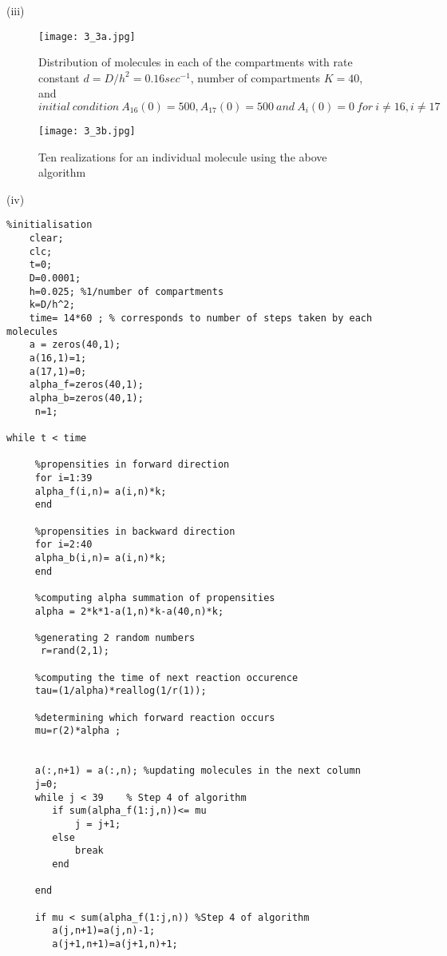 \documentclass[10 pt]{article}
\begin{document}
\begin{multicols}{2}
(iii)\begin{flushleft}
\begin{figure}[H]
\texttt{[image: 3\_3a.jpg]}\label{11}
\caption{Distribution of molecules in each of the compartments with rate constant $d = D/h^2 = 0.16 sec ^{-1}$, number of compartments $K = 40$, and $initial \: condition \: A_16(0) = 500, A_17(0) = 500 \:and\: A_i(0)= 0 \:for\: i \not = 16, i\not = 17$}
\end{figure}
\begin{figure}[H]
\centerline{\texttt{[image: 3\_3b.jpg]}}\label{12}
\caption{Ten realizations for an individual molecule using the above algorithm}
\end{figure}
\end{flushleft}
(iv)\begin{flushleft}
\begin{lstlisting}
%initialisation
    clear;
    clc;
    t=0;
    D=0.0001;
    h=0.025; %1/number of compartments
    k=D/h^2;
    time= 14*60 ; % corresponds to number of steps taken by each molecules
    a = zeros(40,1);
    a(16,1)=1;
    a(17,1)=0; 
    alpha_f=zeros(40,1);
    alpha_b=zeros(40,1);
     n=1;

while t < time
     
     %propensities in forward direction
     for i=1:39
     alpha_f(i,n)= a(i,n)*k;
     end
               
     %propensities in backward direction
     for i=2:40
     alpha_b(i,n)= a(i,n)*k;
     end
                
     %computing alpha summation of propensities
     alpha = 2*k*1-a(1,n)*k-a(40,n)*k;                                              
                
     %generating 2 random numbers
      r=rand(2,1);           
                
     %computing the time of next reaction occurence
     tau=(1/alpha)*reallog(1/r(1));
                
     %determining which forward reaction occurs
     mu=r(2)*alpha ;
                

     a(:,n+1) = a(:,n); %updating molecules in the next column
     j=0;
     while j < 39  	 % Step 4 of algorithm 	
     	if sum(alpha_f(1:j,n))<= mu 
     		j = j+1;
    	else
        	break
        end
                    
     end
                                       
     if mu < sum(alpha_f(1:j,n)) %Step 4 of algorithm	
     	a(j,n+1)=a(j,n)-1;
        a(j+1,n+1)=a(j+1,n)+1;    
                        

\end{lstlisting}
\end{flushleft}
\end{multicols}
\end{document}
